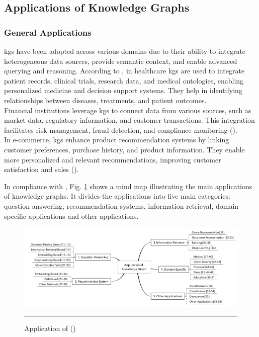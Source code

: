\subsection*{Applications of Knowledge Graphs}

\subsubsection*{General Applications}
\glspl{kg} have been adopted across various domains due to their ability to integrate heterogeneous data sources, provide semantic context, and enable advanced querying and reasoning.
According to \cite{Kapanipathi2020}, in healthcare \glspl{kg} are used to integrate patient records, clinical trials, research data, and medical ontologies, enabling personalized medicine and decision support systems. They help in identifying relationships between diseases, treatments, and patient outcomes.
\\Financial institutions leverage \glspl{kg} to connect data from various sources, such as market data, regulatory information, and customer transactions. This integration facilitates risk management, fraud detection, and compliance monitoring (\cite{Tchechmedjiev2019}).
\\In e-commerce, \glspl{kg} enhance product recommendation systems by linking customer preferences, purchase history, and product information. They enable more personalized and relevant recommendations, improving customer satisfaction and sales (\cite{Zhang2021}).

In compliance with \cite{Zou2020}, Fig. \ref{fig:kg-application-fields} shows a mind map illustrating the main applications of knowledge graphs. It divides the applications into five main categories: question answering, recommendation systems, information retrieval, domain-specific applications and other applications.

\begin{figure}[htbp]
    \centering
 \includegraphics[width=\textwidth]{03_Figures/literature-review/kg-application-fields.png}
     \rule{35em}{0.5pt}
    \caption{Application of  (\cite{Zou2020})} 
 \label{fig:kg-application-fields}
\end{figure}

